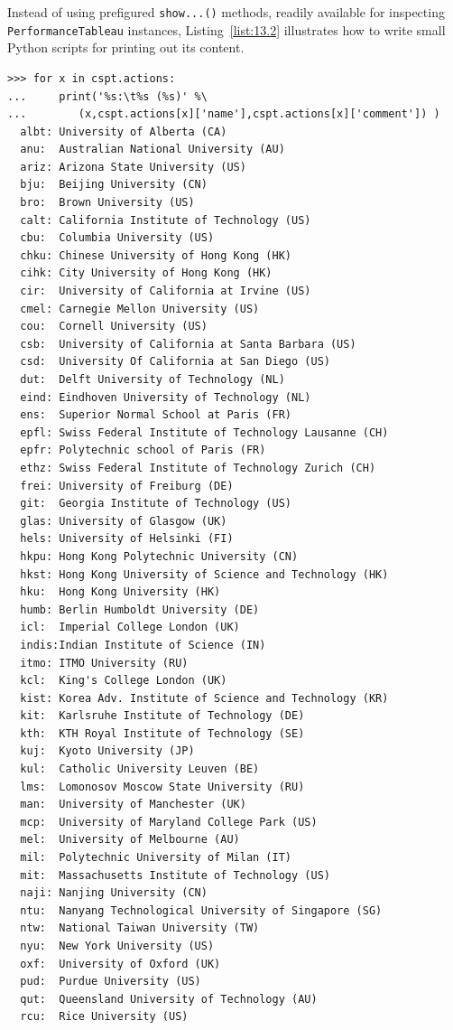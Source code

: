 Instead of using prefigured \Digraph \texttt{show...()} methods, readily available for inspecting \texttt{PerformanceTableau} instances, Listing~\vref{list:13.2} illustrates how to write small Python scripts for printing out its content.   
\begin{lstlisting}[caption={Printing the CS Departments},label=list:13.2,basicstyle=\ttfamily\scriptsize]
>>> for x in cspt.actions:
...     print('%s:\t%s (%s)' %\
...        (x,cspt.actions[x]['name'],cspt.actions[x]['comment']) )
  albt:	University of Alberta (CA)
  anu:	Australian National University (AU)
  ariz:	Arizona State University (US)
  bju:	Beijing University (CN)
  bro:	Brown University (US)
  calt:	California Institute of Technology (US)
  cbu:	Columbia University (US)
  chku:	Chinese University of Hong Kong (HK)
  cihk:	City University of Hong Kong (HK)
  cir:	University of California at Irvine (US)
  cmel:	Carnegie Mellon University (US)
  cou:	Cornell University (US)
  csb:	University of California at Santa Barbara (US)
  csd:	University Of California at San Diego (US)
  dut:	Delft University of Technology (NL)
  eind:	Eindhoven University of Technology (NL)
  ens:	Superior Normal School at Paris (FR)
  epfl:	Swiss Federal Institute of Technology Lausanne (CH)
  epfr:	Polytechnic school of Paris (FR)
  ethz:	Swiss Federal Institute of Technology Zurich (CH)
  frei:	University of Freiburg (DE)
  git:	Georgia Institute of Technology (US)
  glas:	University of Glasgow (UK)
  hels:	University of Helsinki (FI)
  hkpu:	Hong Kong Polytechnic University (CN)
  hkst:	Hong Kong University of Science and Technology (HK)
  hku:	Hong Kong University (HK)
  humb:	Berlin Humboldt University (DE)
  icl:	Imperial College London (UK)
  indis:Indian Institute of Science (IN)
  itmo:	ITMO University (RU)
  kcl:	King's College London (UK)
  kist:	Korea Adv. Institute of Science and Technology (KR)
  kit:	Karlsruhe Institute of Technology (DE)
  kth:	KTH Royal Institute of Technology (SE)
  kuj:	Kyoto University (JP)
  kul:	Catholic University Leuven (BE)
  lms:	Lomonosov Moscow State University (RU)
  man:	University of Manchester (UK)
  mcp:	University of Maryland College Park (US)
  mel:	University of Melbourne (AU)
  mil:	Polytechnic University of Milan (IT)
  mit:	Massachusetts Institute of Technology (US)
  naji:	Nanjing University (CN)
  ntu:	Nanyang Technological University of Singapore (SG)
  ntw:	National Taiwan University (TW)
  nyu:	New York University (US)
  oxf:	University of Oxford (UK)
  pud:	Purdue University (US)
  qut:	Queensland University of Technology (AU)
  rcu:	Rice University (US)

\end{lstlisting}
